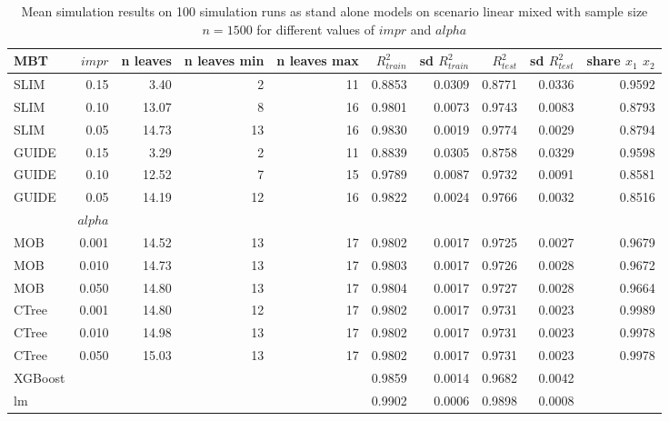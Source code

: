 \begin{table}[!htb]
\centering \tiny
\begin{tabular}[t]{l|r|r|r|r|r|r|r|r|r}
\hline

MBT & $impr$  & n leaves & n leaves min & n leaves max & $R^2_{train}$ & sd $R^2_{train}$ & $R^2_{test}$ & sd $R^2_{test}$ & share $x_1$ $x_2$\\
\hline

SLIM & 0.15 & 3.40 & 2 & 11 & 0.8853 & 0.0309 & 0.8771 & 0.0336 & 0.9592\\
SLIM & 0.10 & 13.07 & 8 & 16 & 0.9801 & 0.0073 & 0.9743 & 0.0083 & 0.8793\\
SLIM & 0.05 & 14.73 & 13 & 16 & 0.9830 & 0.0019 & 0.9774 & 0.0029 & 0.8794\\
GUIDE & 0.15 & 3.29 & 2 & 11 & 0.8839 & 0.0305 & 0.8758 & 0.0329 & 0.9598\\
GUIDE & 0.10 & 12.52 & 7 & 15 & 0.9789 & 0.0087 & 0.9732 & 0.0091 & 0.8581\\
GUIDE & 0.05 & 14.19 & 12 & 16 & 0.9822 & 0.0024 & 0.9766 & 0.0032 & 0.8516\\

\hline

& $alpha$ & & & & & & & \\
\hline

MOB & 0.001 & 14.52 & 13 & 17 & 0.9802 & 0.0017 & 0.9725 & 0.0027 & 0.9679\\
MOB & 0.010 & 14.73 & 13 & 17 & 0.9803 & 0.0017 & 0.9726 & 0.0028 & 0.9672\\
MOB & 0.050 & 14.80 & 13 & 17 & 0.9804 & 0.0017 & 0.9727 & 0.0028 & 0.9664\\

CTree & 0.001 & 14.80 & 12 & 17 & 0.9802 & 0.0017 & 0.9731 & 0.0023 & 0.9989\\
CTree & 0.010 & 14.98 & 13 & 17 & 0.9802 & 0.0017 & 0.9731 & 0.0023 & 0.9978\\
CTree & 0.050 & 15.03 & 13 & 17 & 0.9802 & 0.0017 & 0.9731 & 0.0023 & 0.9978\\
\hline

XGBoost & & & & & 0.9859 & 0.0014 & 0.9682 & 0.0042 &\\
lm & & & & & 0.9902 & 0.0006 & 0.9898 & 0.0008 &\\
\hline

\end{tabular}
\caption{Mean simulation results on 100 simulation runs as stand alone models on scenario linear mixed with sample size $n = 1500$ for different values of $impr$ and $alpha$}
\label{tab:linear_mixed_summary}
\end{table}

